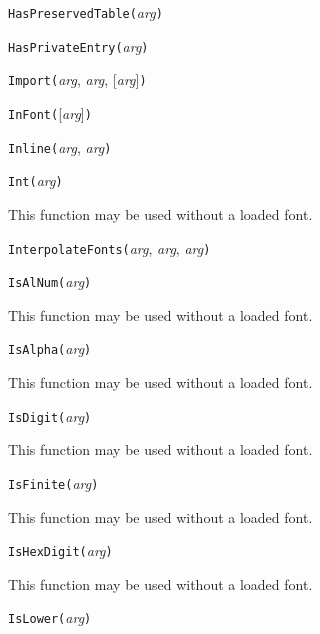 
\noindent\texttt{HasPreservedTable(}\textit{arg}\texttt{)}


\noindent\texttt{HasPrivateEntry(}\textit{arg}\texttt{)}


\noindent\texttt{Import(}\textit{arg}, \textit{arg}, [\textit{arg}]\texttt{)}


\noindent\texttt{InFont(}[\textit{arg}]\texttt{)}


\noindent\texttt{Inline(}\textit{arg}, \textit{arg}\texttt{)}


\noindent\texttt{Int(}\textit{arg}\texttt{)}

This function may be used without a loaded font.


\noindent\texttt{InterpolateFonts(}\textit{arg}, \textit{arg}, \textit{arg}\texttt{)}


\noindent\texttt{IsAlNum(}\textit{arg}\texttt{)}

This function may be used without a loaded font.


\noindent\texttt{IsAlpha(}\textit{arg}\texttt{)}

This function may be used without a loaded font.


\noindent\texttt{IsDigit(}\textit{arg}\texttt{)}

This function may be used without a loaded font.


\noindent\texttt{IsFinite(}\textit{arg}\texttt{)}

This function may be used without a loaded font.


\noindent\texttt{IsHexDigit(}\textit{arg}\texttt{)}

This function may be used without a loaded font.


\noindent\texttt{IsLower(}\textit{arg}\texttt{)}

